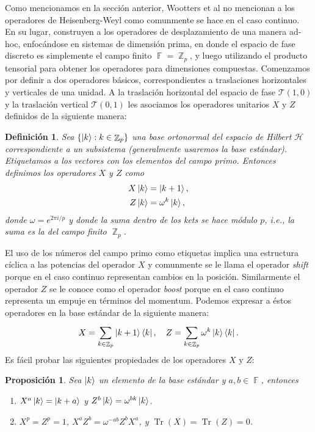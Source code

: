 \documentclass[a4paper]{report}
\DeclareMathOperator{\Z}{\mathbb{Z}}
\DeclareMathOperator{\F}{\mathbb{F}}
\DeclareMathOperator{\Tr}{Tr}
\newtheorem{definition}{Definición}
\newtheorem{proposition}{Proposición}
\begin{document}
  Como mencionamos en la sección anterior, Wootters et al no
  mencionan a los operadores de Heisenberg-Weyl como
  comunmente se hace en el caso continuo. En su lugar,
  construyen a los operadores de desplazamiento de una
  manera ad-hoc, enfocándose en sistemas de dimensión prima,
  en donde el espacio de fase discreto es simplemente el
  campo finito $\F = \Z_p$, y luego utilizando el producto
  tensorial para obtener los operadores para dimensiones
  compuestas. Comenzamos por definir a dos operadores
  básicos, correspondientes a traslaciones horizontales y
  verticales de una unidad. A la traslación horizontal del
  espacio de fase $\mathcal T(1,0)$ y la traslación vertical
  $\mathcal T(0,1)$ les asociamos los operadores unitarios
  $X$ y $Z$ definidos de la siguiente manera:
  \begin{definition}
    Sea $\{\ket k : k \in \Z_p\}$ una base ortonormal del
    espacio de Hilbert $\mathcal H$ correspondiente a un
    subsistema (generalmente usaremos la base estándar).
    Etiquetamos a los vectores con los elementos del campo
    primo. Entonces definimos los operadores $X$ y $Z$ como
    \begin{align}
      X \ket k
      &= \ket{k + 1}, \\
      Z \ket k
      &= \omega^{k} \ket k,
    \end{align}
    donde $\omega = e^{2\pi i / p}$ y donde la suma dentro
    de los kets se hace módulo $p$, i.e., la suma es la del
    campo finito $\Z_p$.
  \end{definition}
  El uso de los números del campo primo como etiquetas
  implica una estructura cíclica a las potencias del
  operador $X$ y comunmente se le llama el operador
  \textit{shift} porque en el caso continuo representan
  cambios en la posición. Similarmente el operador $Z$ se le
  conoce como el operador \textit{boost} porque en el caso
  continuo representa un empuje en términos del momentum.
  Podemos expresar a éstos operadores en la base
  estándar de la siguiente manera:
  \begin{equation}
    X = \sum_{k \in \Z_p}^{} \ket{k+1}\bra{k}, \\
    \quad
    Z = \sum_{k \in \Z_p}^{} \omega^{k} \ket k \bra k.
  \end{equation}
  Es fácil probar las siguientes propiedades de los
  operadores $X$ y $Z$:
  \begin{proposition}
    \label{prop:prime_XZ_props}
    Sea $\ket k$ un elemento de la base estándar y $a,b \in
    \F$, entonces
    \begin{enumerate}
      \item $X^{a} \ket{k} = \ket{k+a}$ y $Z^{b} \ket{k} =
        \omega^{b k} \ket{k}$.
      \item $X^{p} = Z^{p} = 1$, $X^{a} Z^{b} = \omega^{-ab}
        Z^{b} X^{a}$, y $\Tr(X) = \Tr(Z) = 0$.
    \end{enumerate}
  \end{proposition}
   
\end{document}
